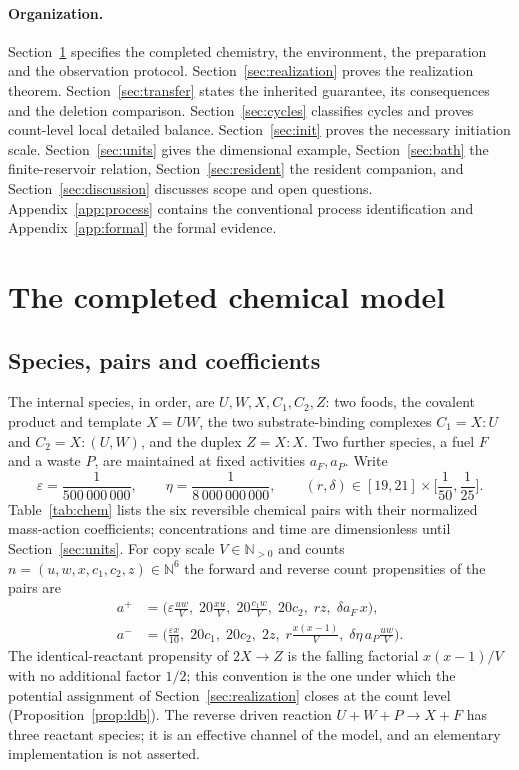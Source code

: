 \documentclass[11pt,a4paper]{article}
\theoremstyle{plain}
\theoremstyle{definition}
\theoremstyle{remark}
\newcommand{\N}{\mathbb N}
\newcommand{\eps}{\varepsilon}
\begin{document}
\paragraph{Organization.}
Section~\ref{sec:model} specifies the completed chemistry, the environment, the preparation and the observation protocol. Section~\ref{sec:realization} proves the realization theorem. Section~\ref{sec:transfer} states the inherited guarantee, its consequences and the deletion comparison. Section~\ref{sec:cycles} classifies cycles and proves count-level local detailed balance. Section~\ref{sec:init} proves the necessary initiation scale. Section~\ref{sec:units} gives the dimensional example, Section~\ref{sec:bath} the finite-reservoir relation, Section~\ref{sec:resident} the resident companion, and Section~\ref{sec:discussion} discusses scope and open questions. Appendix~\ref{app:process} contains the conventional process identification and Appendix~\ref{app:formal} the formal evidence.

\section{The completed chemical model}\label{sec:model}

\subsection{Species, pairs and coefficients}\label{sec:pairs}
The internal species, in order, are $U,W,X,C_1,C_2,Z$: two foods, the covalent product and template $X=UW$, the two substrate-binding complexes $C_1=X{:}U$ and $C_2=X{:}(U,W)$, and the duplex $Z=X{:}X$. Two further species, a fuel $F$ and a waste $P$, are maintained at fixed activities $a_F,a_P$. Write
\begin{equation}\label{eq:parameters}
 \eps=\frac1{500\,000\,000},\qquad \eta=\frac1{8\,000\,000\,000},\qquad
 (r,\delta)\in[19,21]\times\Big[\frac1{50},\frac1{25}\Big].
\end{equation}
Table~\ref{tab:chem} lists the six reversible chemical pairs with their normalized mass-action coefficients; concentrations and time are dimensionless until Section~\ref{sec:units}. For copy scale $V\in\N_{>0}$ and counts $n=(u,w,x,c_1,c_2,z)\in\N^6$ the forward and reverse count propensities of the pairs are
\begin{equation}\label{eq:propensities}
\begin{aligned}
 a^+&=\Big(\eps\frac{uw}{V},\;20\frac{xu}{V},\;20\frac{c_1w}{V},\;20c_2,\;rz,\;\delta a_F\,x\Big),\\
 a^-&=\Big(\frac{\eps x}{10},\;20c_1,\;20c_2,\;2z,\;r\frac{x(x-1)}{V},\;\delta\eta\,a_P\frac{uw}{V}\Big).
\end{aligned}
\end{equation}
The identical-reactant propensity of $2X\to Z$ is the falling factorial $x(x-1)/V$ with no additional factor $1/2$; this convention is the one under which the potential assignment of Section~\ref{sec:realization} closes at the count level (Proposition~\ref{prop:ldb}). The reverse driven reaction $U+W+P\to X+F$ has three reactant species; it is an effective channel of the model, and an elementary implementation is not asserted.
\end{document}
